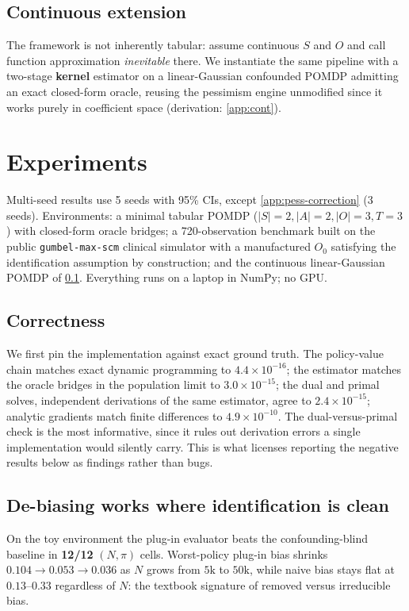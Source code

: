 \documentclass{article}
\theoremstyle{plain}
\theoremstyle{definition}
\begin{document}
\subsection{Continuous extension}
\label{sec:method-cont}
The framework is not inherently tabular: \citet{hong2024} assume continuous $S$
and $O$ and call function approximation \emph{inevitable} there. We instantiate
the same pipeline with a two-stage \textbf{kernel} estimator on a linear-Gaussian
confounded POMDP admitting an exact closed-form oracle, reusing the pessimism
engine unmodified since it works purely in coefficient space
(derivation: \cref{app:cont}).

\section{Experiments}
\label{sec:exp}

Multi-seed results use 5 seeds with 95\% CIs, except
\cref{app:pess-correction} (3 seeds). Environments:
a minimal tabular POMDP ($|S|{=}2, |A|{=}2, |O|{=}3, T{=}3$) with closed-form
oracle bridges; a 720-observation benchmark built on the public
\texttt{gumbel-max-scm} clinical simulator \citep{oberst2019} with a manufactured
$O_0$ satisfying the identification assumption by construction; and the
continuous linear-Gaussian POMDP of \cref{sec:method-cont}. Everything runs on a
laptop in NumPy; no GPU.

\subsection{Correctness}
\label{sec:exp-correct}
We first pin the implementation against exact ground truth. The policy-value
chain matches exact dynamic programming to $4.4\times10^{-16}$; the estimator
matches the oracle bridges in the population limit to $3.0\times10^{-15}$; the
dual and primal solves, independent derivations of the same estimator, agree to
$2.4\times10^{-15}$; analytic gradients match finite differences to
$4.9\times10^{-10}$. The dual-versus-primal check is the most informative, since
it rules out derivation errors a single implementation would silently carry. This
is what licenses reporting the negative results below as findings rather than
bugs.

\subsection{De-biasing works where identification is clean}
On the toy environment the plug-in evaluator beats the confounding-blind baseline
in \textbf{12/12} $(N,\pi)$ cells. Worst-policy plug-in bias shrinks
$0.104 \to 0.053 \to 0.036$ as $N$ grows from $5\mathrm{k}$ to $50\mathrm{k}$,
while naive bias stays flat at $0.13$--$0.33$ regardless of $N$: the textbook
signature of removed versus irreducible bias.
\end{document}
